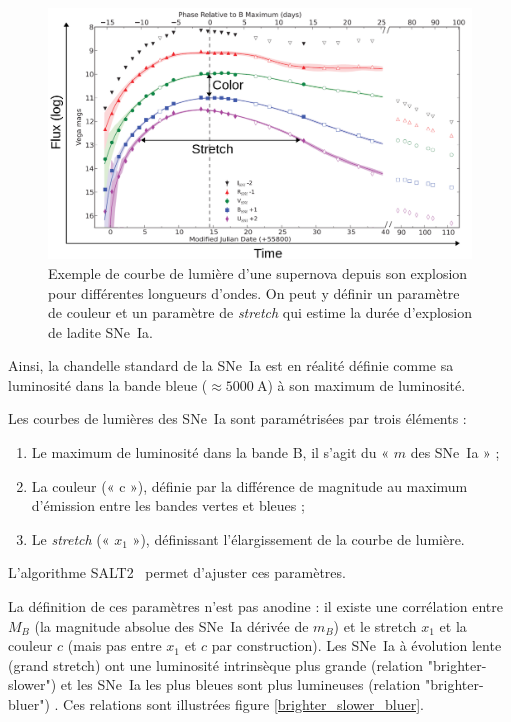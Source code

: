 \documentclass[a4paper, 12pt, svgnames]{article}
\begin{document}
\begin{figure}[htbp!]
    \centering
    \includegraphics[width=.7\linewidth]{Rapport_figures/lightcurve.png}
    \captionsetup{justification=centering}
    \caption{Exemple de courbe de lumière d'une supernova depuis son explosion
    pour différentes longueurs d'ondes. On peut y définir un paramètre de
couleur et un paramètre de \textit{stretch} qui estime la durée d'explosion de
ladite SNe~Ia. \cite{pereira_spectrophotometric_2013}}
    \label{fig:lightcurves}
\end{figure}

Ainsi, la chandelle standard de la SNe~Ia est en réalité définie comme sa
luminosité dans la bande bleue ($\approx \SI{5000}{\A}$) à son maximum de
luminosité.

Les courbes de lumières des SNe~Ia sont paramétrisées par trois éléments :

\begin{enumerate}
    \item Le maximum de luminosité dans la bande B, il s'agit du « $m$ des
        SNe~Ia » ;
    \item La couleur (« c »), définie par la différence de magnitude au maximum
        d'émission entre les bandes vertes et bleues ;
    \item Le \textit{stretch} (« $x_1$ »), définissant l'élargissement de la
        courbe de lumière.
\end{enumerate}

L'algorithme SALT2~\cite{guy_salt2_2007, guy_supernova_2010} permet d'ajuster
ces paramètres.

La définition de ces paramètres n'est pas anodine : il existe une corrélation
entre $M_B$ (la magnitude absolue des SNe~Ia dérivée de $m_B$) et le stretch
$x_1$ et la couleur $c$ (mais pas entre $x_1$ et $c$ par construction). Les
SNe~Ia à évolution lente (grand stretch) ont une luminosité intrinsèque plus
grande (relation "brighter-slower") \cite{phillips_absolute_1999} et les
SNe~Ia les plus bleues sont plus lumineuses (relation "brighter-bluer")
\cite{tripp_two-parameter_1998, riess_first_2006}. Ces relations sont illustrées
figure \ref{brighter_slower_bluer}. \bigbreak
\end{document}
